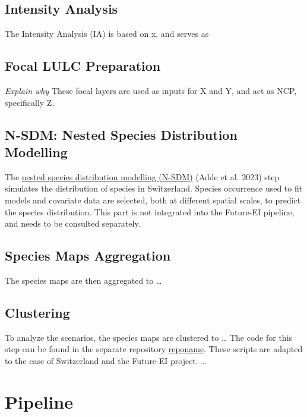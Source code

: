 \documentclass[
  letterpaper,
  DIV=11,
  numbers=noendperiod]{scrreprt}
\begin{document}
\section{Intensity Analysis}\label{intensity-analysis}

The Intensity Analysis (IA) is based on x, and serves as

\section{Focal LULC Preparation}\label{focal-lulc-preparation}

\emph{Explain why} These focal layers are used as inputs for X and Y,
and act as NCP, specifically Z.

\section{N-SDM: Nested Species Distribution
Modelling}\label{n-sdm-nested-species-distribution-modelling}

The \href{https://github.com/N-SDM/N-SDM}{nested species distribution
modelling (N-SDM)} (Adde et al. 2023) step simulates the distribution of
species in Switzerland. Species occurrence used to fit models and
covariate data are selected, both at different spatial scales, to
predict the species distribution. This part is not integrated into the
Future-EI pipeline, and needs to be consulted separately.

\section{Species Maps Aggregation}\label{species-maps-aggregation}

The species maps are then aggregated to \ldots{}

\section{Clustering}\label{clustering}

To analyze the scenarios, the species maps are clustered to \ldots{} The
code for this step can be found in the separate repository
\href{https://github.com/blenback/reponame}{reponame}. These scripts are
adapted to the case of Switzerland and the Future-EI project. \ldots{}


\chapter{Pipeline}\label{pipeline}
\end{document}
